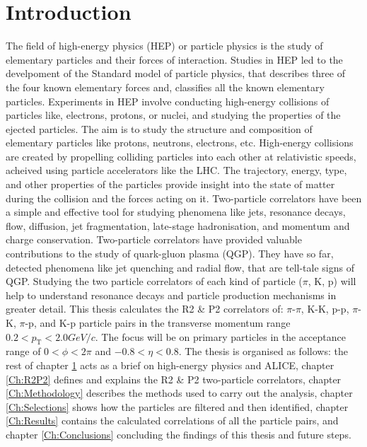 \documentclass[12pt,a4paper,twoside]{report}
\begin{document}
\chapter{Introduction}\label{Ch:Introduction}
The field of high-energy physics (HEP) or particle physics is the study of elementary particles and their forces of interaction. Studies in HEP led to the develpoment of the Standard model of particle physics, that describes three of the four known elementary forces and, classifies all the known elementary particles. Experiments in HEP involve conducting high-energy collisions of particles like, electrons, protons, or nuclei, and studying the properties of the ejected particles. The aim is to study the structure and composition of elementary particles like protons, neutrons, electrons, etc. High-energy collisions are created by propelling colliding particles into each other at relativistic speeds, acheived using particle accelerators like the LHC. The trajectory, energy, type, and other properties of the particles provide insight into the state of matter during the collision and the forces acting on it. Two-particle correlators have been a simple and effective tool for studying phenomena like jets, resonance decays, flow, diffusion, jet fragmentation, late-stage hadronisation, and momentum and charge conservation. Two-particle correlators have provided valuable contributions to the study of quark-gluon plasma (QGP). They have so far, detected phenomena like jet quenching \cite{Ref:jetQ-paper1}\cite{Ref:jetQ-paper2} and radial flow\cite{Ref:flow-paper}, that are tell-tale signs of QGP. Studying the two particle correlators of each kind of particle ($\pi$, K, p) will help to understand resonance decays and particle production mechanisms in greater detail. This thesis calculates the R2 \& P2 correlators of: $\pi$-$\pi$, K-K, p-p, $\pi$-K, $\pi$-p, and K-p particle pairs in the transverse momentum range $0.2<p_\mathrm{T}<2.0 GeV/c$. The focus will be on primary particles in the acceptance range of $0<\phi<2\pi$ and $-0.8<\eta<0.8$. The thesis is organised as follows: the rest of chapter \ref{Ch:Introduction} acts as a brief on high-energy physics and ALICE, chapter \ref{Ch:R2P2} defines and explains the R2 \& P2 two-particle correlators, chapter \ref{Ch:Methodology} describes the methods used to carry out the analysis, chapter \ref{Ch:Selections} shows how the particles are filtered and then identified, chapter \ref{Ch:Results} contains the calculated correlations of all the particle pairs, and chapter \ref{Ch:Conclusions} concluding the findings of this thesis and future steps.
\newpage
\end{document}
